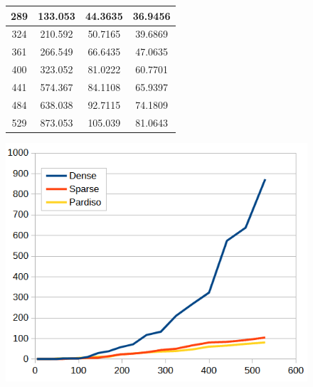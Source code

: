 \documentclass[letterpaper, 10 pt, conference]{ieeeconf}  %
\begin{document}
\begin{figure}
\begin{minipage}[b]{.45\linewidth}
\begin{center}
\begin{tabular}{|c|c|c|c|}
                        289               & 133.053        & 44.3635         & 36.9456          \\ \hline
                        324               & 210.592        & 50.7165         & 39.6869          \\ \hline
                        361               & 266.549        & 66.6435         & 47.0635          \\ \hline
                        400               & 323.052        & 81.0222         & 60.7701          \\ \hline
                        441               & 574.367        & 84.1108         & 65.9397          \\ \hline
                        484               & 638.038        & 92.7115         & 74.1809          \\ \hline
                        529               & 873.053        & 105.039         & 81.0643          \\ \hline
                        \end{tabular}
                \end{center}
                 \label{fig:frametimes}
        \end{minipage}\hfill
        \begin{minipage}[b]{.45\linewidth}
                \centering
                \includegraphics[width=1.1\linewidth]{frametimes.PNG}
        \end{minipage}
\end{figure}
\end{document}
